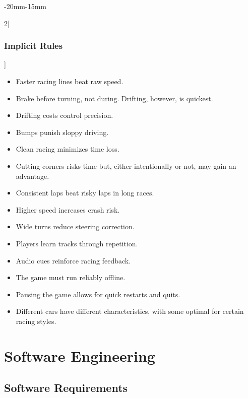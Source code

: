 \documentclass[12pt]{article}
\begin{document}
\begin{adjustwidth}{-20mm}{-15mm}
\begin{multicols}{2}[\subsubsection{Implicit Rules}]
\raggedcolumns
\begin{itemize}
\item Faster racing lines beat raw speed.
\item Brake before turning, not during. Drifting, however, is quickest.
\item Drifting costs control precision.
\item Bumps punish sloppy driving.
\item Clean racing minimizes time loss.
\item Cutting corners risks time but, either intentionally or not, may gain an advantage.
\item Consistent laps beat risky laps in long races.
\item Higher speed increases crash risk.
\item Wide turns reduce steering correction.
\item Players learn tracks through repetition.
\item Audio cues reinforce racing feedback.
\item The game must run reliably offline.
\item Pausing the game allows for quick restarts and quits.
\item Different cars have different characteristics, with some optimal for certain racing styles.
\end{itemize}
\end{multicols}
\end{adjustwidth}

\section{Software Engineering}

\subsection{Software Requirements}
\end{document}

